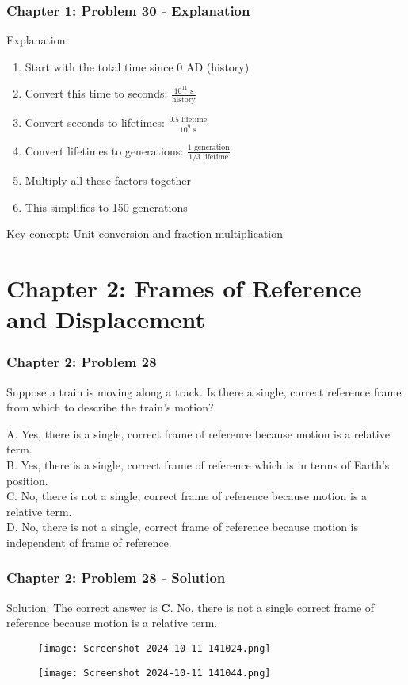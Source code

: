 \documentclass{beamer}
\begin{document}
\begin{frame}
\frametitle{Chapter 1: Problem 30 - Explanation}
Explanation:
\begin{enumerate}
    \item Start with the total time since 0 AD (history)
    \item Convert this time to seconds: $\frac{10^{11} \text{ s}}{\text{history}}$
    \item Convert seconds to lifetimes: $\frac{0.5 \text{ lifetime}}{10^{9} \text{ s}}$
    \item Convert lifetimes to generations: $\frac{1 \text{ generation}}{1/3 \text{ lifetime}}$
    \item Multiply all these factors together
    \item This simplifies to 150 generations
\end{enumerate}
Key concept: Unit conversion and fraction multiplication
\end{frame}

\section{Chapter 2: Frames of Reference and Displacement}

\begin{frame}
\frametitle{Chapter 2: Problem 28}
Suppose a train is moving along a track. Is there a single, correct reference frame from which to describe the train's motion?

A. Yes, there is a single, correct frame of reference because motion is a relative term.\\
B. Yes, there is a single, correct frame of reference which is in terms of Earth's position.\\
C. No, there is not a single, correct frame of reference because motion is a relative term.\\
D. No, there is not a single, correct frame of reference because motion is independent of frame of reference.
\end{frame}

\begin{frame}
\frametitle{Chapter 2: Problem 28 - Solution}
Solution: The correct answer is \textbf{C}. No, there is not a single correct frame of reference because motion is a relative term.
\begin{figure}
    \centering
    \texttt{[image: Screenshot 2024-10-11 141024.png]}
\end{figure}
\begin{figure}
    \centering
    \texttt{[image: Screenshot 2024-10-11 141044.png]}
\end{figure}
\end{frame}
\end{document}
